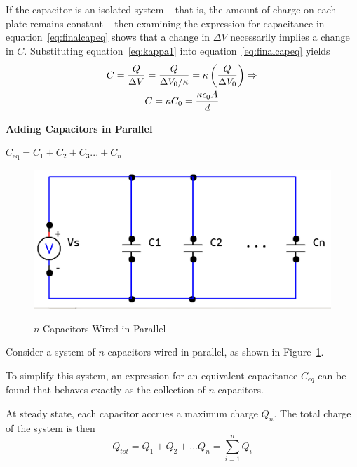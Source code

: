 \documentclass[twocolumn,english]{IEEEtran}
\theoremstyle{plain}
\theoremstyle{plain}
\begin{document}
\begin{enumerate}
If the capacitor is an isolated system -- that is, the amount of charge on each plate remains constant -- then examining the expression for capacitance in equation~\ref{eq:finalcapeq} shows that a change in $\Delta V$ necessarily implies a change in $C$. Substituting equation~\ref{eq:kappa1} into equation~\ref{eq:finalcapeq} yields
\begin{gather}\label{eq:kappa}
  C = \frac{Q}{\Delta V} = \frac{Q}{\Delta V_0 / \kappa} = \kappa \left(\frac{Q}{\Delta V_0}\right) \Rightarrow \notag \\
  C = \kappa C_0 = \frac{\kappa \epsilon_0 A}{d}
\end{gather}
\end{enumerate}

\noindent \hrulefill

\noindent \textbf{Adding Capacitors in Parallel}

\noindent$C_{\text{eq}}=C_1+C_2+C_3...+C_n$

  \begin{figure}[h!]
  \begin{centering}
  \begin{center}
  \includegraphics[width=\linewidth]{./parallelc.png}
  \label{fig:parallel_diagram}
  \caption{$n$ Capacitors Wired in Parallel}
  \end{center}
  \par\end{centering}
  \end{figure}

  Consider a system of $n$ capacitors wired in parallel, as shown in Figure~\ref{fig:parallel_diagram}.

  To simplify this system, an expression for an equivalent capacitance $C_{eq}$ can be found that behaves exactly as the collection of $n$ capacitors.

  At steady state, each capacitor accrues a maximum charge $Q_n$. The total charge of the system is then
  \begin{equation}\label{eq:qdots}
  Q_{tot} = Q_1 + Q_2 + \dots Q_n = \sum_{i=1}^{n} Q_i
  \end{equation}
\end{document}
